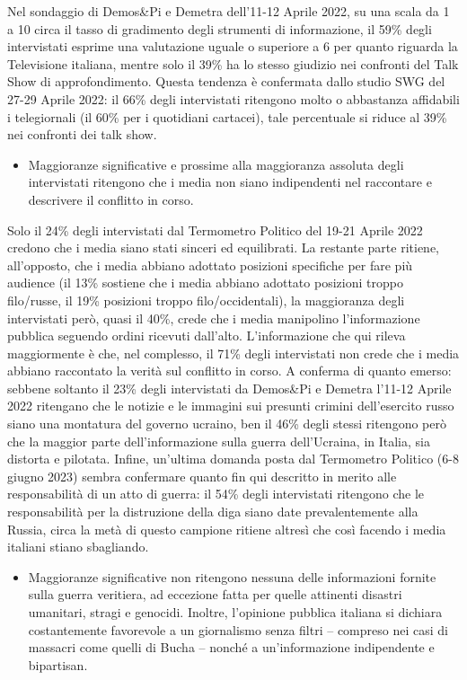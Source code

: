 \documentclass[
  openany]{book}
\providecommand{\tightlist}{%
  \setlength{\itemsep}{0pt}\setlength{\parskip}{0pt}}
\begin{document}
Nel sondaggio di Demos\&Pi e Demetra dell'11-12 Aprile 2022, su una scala da 1 a 10 circa il tasso di gradimento degli strumenti di informazione, il 59\% degli intervistati esprime una valutazione uguale o superiore a 6 per quanto riguarda la Televisione italiana, mentre solo il 39\% ha lo stesso giudizio nei confronti del Talk Show di approfondimento. Questa tendenza è confermata dallo studio SWG del 27-29 Aprile 2022: il 66\% degli intervistati ritengono molto o abbastanza affidabili i telegiornali (il 60\% per i quotidiani cartacei), tale percentuale si riduce al 39\% nei confronti dei talk show.

\begin{itemize}
\tightlist
\item
  Maggioranze significative e prossime alla maggioranza assoluta degli intervistati ritengono che i media non siano indipendenti nel raccontare e descrivere il conflitto in corso.
\end{itemize}

Solo il 24\% degli intervistati dal Termometro Politico del 19-21 Aprile 2022 credono che i media siano stati sinceri ed equilibrati. La restante parte ritiene, all'opposto, che i media abbiano adottato posizioni specifiche per fare più audience (il 13\% sostiene che i media abbiano adottato posizioni troppo filo/russe, il 19\% posizioni troppo filo/occidentali), la maggioranza degli intervistati però, quasi il 40\%, crede che i media manipolino l'informazione pubblica seguendo ordini ricevuti dall'alto. L'informazione che qui rileva maggiormente è che, nel complesso, il 71\% degli intervistati non crede che i media abbiano raccontato la verità sul conflitto in corso. A conferma di quanto emerso: sebbene soltanto il 23\% degli intervistati da Demos\&Pi e Demetra l'11-12 Aprile 2022 ritengano che le notizie e le immagini sui presunti crimini dell'esercito russo siano una montatura del governo ucraino, ben il 46\% degli stessi ritengono però che la maggior parte dell'informazione sulla guerra dell'Ucraina, in Italia, sia distorta e pilotata. Infine, un'ultima domanda posta dal Termometro Politico (6-8 giugno 2023) sembra confermare quanto fin qui descritto in merito alle responsabilità di un atto di guerra: il 54\% degli intervistati ritengono che le responsabilità per la distruzione della diga siano date prevalentemente alla Russia, circa la metà di questo campione ritiene altresì che così facendo i media italiani stiano sbagliando.

\begin{itemize}
\tightlist
\item
  Maggioranze significative non ritengono nessuna delle informazioni fornite sulla guerra veritiera, ad eccezione fatta per quelle attinenti disastri umanitari, stragi e genocidi. Inoltre, l'opinione pubblica italiana si dichiara costantemente favorevole a un giornalismo senza filtri -- compreso nei casi di massacri come quelli di Bucha -- nonché a un'informazione indipendente e bipartisan.
\end{itemize}
\end{document}
